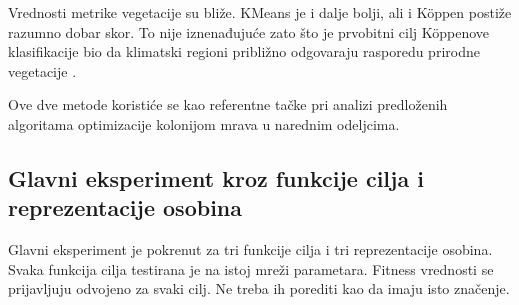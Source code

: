 \documentclass[11pt]{article}
\begin{document}
Vrednosti metrike vegetacije su bliže. KMeans je i dalje bolji, ali i Köppen postiže razumno dobar skor. To nije iznenađujuće zato što je prvobitni cilj Köppenove klasifikacije bio da klimatski regioni približno odgovaraju rasporedu prirodne vegetacije \cite{koppen1936,peel2007}.

Ove dve metode koristiće se kao referentne tačke pri analizi predloženih algoritama optimizacije kolonijom mrava u narednim odeljcima.

\subsection{Glavni eksperiment kroz funkcije cilja i reprezentacije osobina}

Glavni eksperiment je pokrenut za tri funkcije cilja i tri reprezentacije osobina. Svaka funkcija cilja testirana je na istoj mreži parametara. Fitness vrednosti se prijavljuju odvojeno za svaki cilj. Ne treba ih porediti kao da imaju isto značenje.

\begin{table}[ht]
\centering
\caption{Sažetak glavnog eksperimenta za centroidnu funkciju cilja.}
\label{tab:stage1_centroid_fitness_summary}
\end{table}

\begin{table}[ht]
\centering
\caption{Sažetak glavnog eksperimenta za silhouette funkciju cilja.}
\label{tab:stage1_silhouette_fitness_summary}
\end{table}
\end{document}
